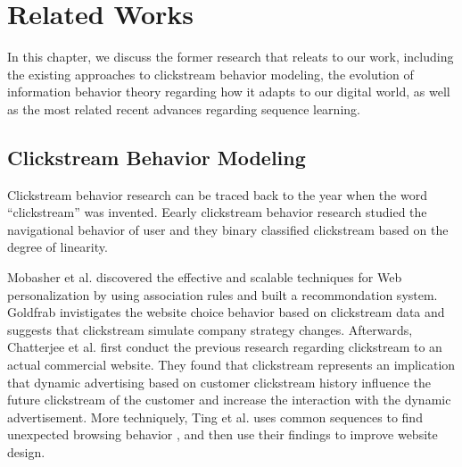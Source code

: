\section{Related Works}
\label{ch:relate}


In this chapter, we discuss the former research that releats to our work, including
the existing approaches to clickstream behavior modeling, the evolution of information 
behavior theory regarding how it adapts to our digital world, as well as the 
most related recent advances regarding sequence learning.

\subsection{Clickstream Behavior Modeling}

Clickstream behavior research can be traced back to the year when the word ``clickstream''
was invented. Eearly clickstream behavior research studied the navigational behavior
of user \cite{mandese1995clickstreams, brodwin1995} and 
they binary classified clickstream based on the degree of linearity.

Mobasher et al. discovered the effective and scalable techniques \cite{Mobasher:2001:EPB:502932.502935} for Web personalization
by using association rules and built a recommondation system. Goldfrab invistigates \cite{goldfarb2002analyzing} 
the website choice behavior based on clickstream data and suggests that clickstream simulate company strategy changes.
Afterwards, 
Chatterjee et al. \cite{chatterjee2003modeling} first conduct 
the previous research regarding clickstream to an actual commercial website.
They found that clickstream represents an implication that dynamic advertising
based on customer clickstream history influence the future clickstream of the customer
and increase the interaction with the dynamic advertisement.
More techniquely, Ting et al. uses common sequences to find unexpected browsing behavior \cite{Ting:2005:UMF:1092358.1092469},
and then use their findings to improve website design. 


